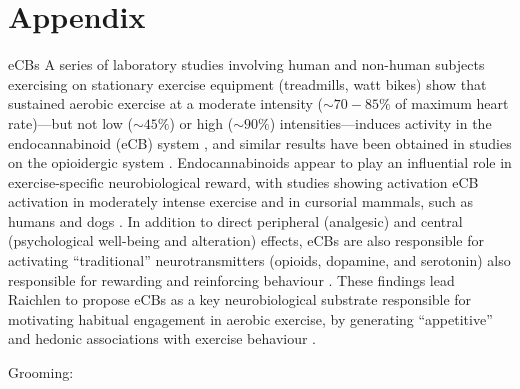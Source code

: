 \chapter{\label{app1:intro}Appendix}



eCBs
A series of laboratory studies involving human and non-human subjects exercising on stationary exercise equipment (treadmills, watt bikes) show that sustained aerobic exercise at a moderate intensity ($\sim70-85\%$ of maximum heart rate)---but not low ($\sim45\%$) or high ($\sim90\%$) intensities---induces activity in the endocannabinoid (eCB) system \citep{Raichlen2013}, and similar results have been obtained in studies on the opioidergic system \citep{Boecker2008}.  Endocannabinoids appear to play an influential role in exercise-specific neurobiological reward, with studies showing activation eCB activation in moderately intense exercise and in cursorial mammals, such as humans and dogs \citep[but not non-cursorial mammals, e.g., ferrets;][]{Raichlen2012}.  In addition to direct peripheral (analgesic) and central (psychological well-being and alteration) effects, eCBs are also responsible for activating ``traditional'' neurotransmitters (opioids, dopamine, and serotonin) also responsible for rewarding and reinforcing behaviour \citep{Sparling2003}.  These findings lead Raichlen to propose eCBs as a key neurobiological substrate responsible for motivating habitual engagement in aerobic exercise, by generating ``appetitive'' and hedonic associations with exercise behaviour \citep{Raichlen2012}.







Grooming:


